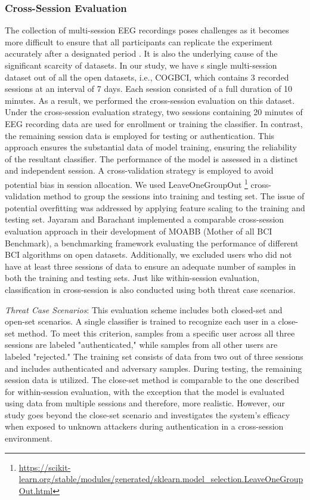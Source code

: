 \subsubsection{Cross-Session Evaluation}
The collection of multi-session EEG recordings poses challenges as it becomes more difficult to ensure that all participants can replicate the experiment accurately after a designated period \cite{huang2022m3cv}. It is also the underlying cause of the significant scarcity of datasets. In our study, we have s single multi-session dataset out of all the open datasets, i.e., COGBCI, which contains 3 recorded sessions at an interval of 7 days. Each session consisted of a full duration of 10 minutes. As a result, we performed the cross-session evaluation on this dataset. Under the cross-session evaluation strategy, two sessions containing 20 minutes of EEG recording data are used for enrollment or training the classifier.
In contrast, the remaining session data is employed for testing or authentication. This approach ensures the substantial data of model training, ensuring the reliability of the resultant classifier. The performance of the model is assessed in a distinct and independent session. A cross-validation strategy is employed to avoid potential bias in session allocation. We used LeaveOneGroupOut \footnote{\url{https://scikit-learn.org/stable/modules/generated/sklearn.model_selection.LeaveOneGroupOut.html}} cross-validation method to group the sessions into training and testing set. The issue of potential overfitting was addressed by applying feature scaling to the training and testing set. Jayaram and Barachant \cite{moabb} implemented a comparable cross-session evaluation approach in their development of MOABB (Mother of all BCI Benchmark), a benchmarking framework evaluating the performance of different BCI algorithms on open datasets. Additionally, we excluded users who did not have at least three sessions of data to ensure an adequate number of samples in both the training and testing sets. Just like within-session evaluation, classification in cross-session is also conducted using both threat case scenarios.
\smallskip

\textit{Threat Case Scenarios}: 
This evaluation scheme includes both closed-set and open-set scenarios. A single classifier is trained to recognize each user in a close-set method. To meet this criterion, samples from a specific user across all three sessions are labeled "authenticated," while samples from all other users are labeled "rejected."  The training set consists of data from two out of three sessions and includes authenticated and adversary samples. During testing, the remaining session data is utilized.
The close-set method is comparable to the one described for within-session evaluation, with the exception that the model is evaluated using data from multiple sessions and therefore, more realistic. However, our study goes beyond the close-set scenario and investigates the system's efficacy when exposed to unknown attackers during authentication in a cross-session environment. 
\smallskip

